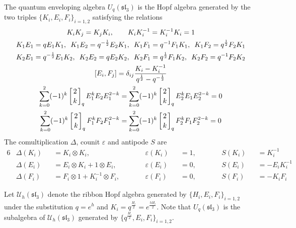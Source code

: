 \documentclass[12pt,oneside,reqno]{amsart}
\numberwithin{teorema}{section}
\numberwithin{definicion}{section}
\numberwithin{lema}{section}
\numberwithin{conjetura}{section}
\numberwithin{proposicion}{section}
\def\sl{\mathfrak{sl}}
\def\Uh{\mathcal{U}_h}
\def\Uq{U_q}
\newcommand{\qbinom}[2]{\left[\genfrac{}{}{0pt}{}{#1}{#2}\right]_q}
\begin{document}
The quantum enveloping algebra $\Uq(\sl_3)$ is the Hopf algebra generated by the two triples $\{K_i,E_i,F_i\}_{i=1,2}$ satisfying the relations
\begin{gather}
    \label{eq:Uhsl3-K-relation} K_iK_j=K_jK_i, \qquad K_iK_i^{-1}=K_i^{-1}K_i=1 \\
    \label{eq:Uhsl3-KE-relation1} K_1E_1=qE_1K_1, \hspace{0.5em} K_1E_2=q^{-\frac12}E_2K_1, \hspace{0.5em}
    K_1F_1=q^{-1}F_1K_1, \hspace{0.5em} K_1F_2=q^\frac12F_2K_1 \\
    \label{eq:Uhsl3-KE-relation2} K_2E_1=q^{-\frac12}E_1K_2, \hspace{0.5em} K_2E_2=qE_2K_2, \hspace{0.5em}
    K_2F_1=q^\frac12F_1K_2, \hspace{0.5em} K_2F_2=q^{-1}F_2K_2 \\
    [E_i,F_j]=\delta_{ij}\frac{K_i-K_i^{-1}}{q^\frac12-q^{-\frac12}} \\ \label{eq:Uhsl3-E-relation}
    \sum_{k=0}^2 (-1)^k \qbinom{2}{k} E_1^kE_2E_1^{2-k}=\sum_{k=0}^2 (-1)^k \qbinom{2}{k} E_2^kE_1E_2^{2-k}=0 \\
    \label{eq:Uhsl3-F-relation} \sum_{k=0}^2 (-1)^k \qbinom{2}{k} F_1^kF_2F_1^{2-k}=\sum_{k=0}^2 (-1)^k \qbinom{2}{k} F_2^kF_1F_2^{2-k}=0 
\end{gather}
The comultiplication $\Delta$, counit $\varepsilon$ and antipode $S$ are
\begin{alignat}{6}
    \label{eq:Uhsl3-structure-1} &\Delta(K_i) &&= K_i\otimes K_i, \hspace{1em} &&\varepsilon(K_i) &&= 1, \hspace{1em} &&S(K_i)&&=K_i^{-1} \\
    &\Delta(E_i) &&= E_i\otimes K_i + 1\otimes E_i, \hspace{1em} &&\varepsilon(E_i) &&= 0, \hspace{1em} &&S(E_i)&&=-E_iK_i^{-1} \\
    \label{eq:Uhsl3-structure-3} &\Delta(F_i) &&= F_i\otimes 1 + K_i^{-1}\otimes F_i, \hspace{2em} &&\varepsilon(F_i) &&= 0, \hspace{2em} &&S(F_i)&&=-K_iF_i
\end{alignat}

Let $\Uh(\sl_3)$ denote the ribbon Hopf algebra generated by $\{H_i,E_i,F_i\}_{i=1,2}$ under the substitution $q=e^{h}$ and $K_i=q^{\frac{H_i}{2}}=e^{\frac{h H_i}{2}}$. Note that $\Uq(\sl_3)$ is the subalgebra of $\Uh(\sl_3)$ generated by $\{q^{\frac{H_i}{2}},E_i,F_i\}_{i=1,2}$.
\end{document}
